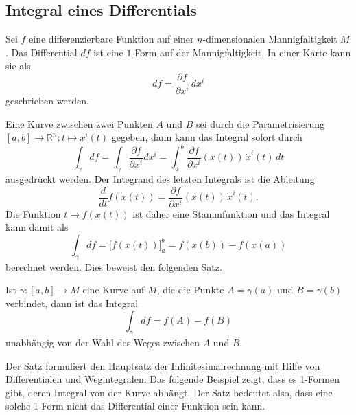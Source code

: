 %
%
\subsection{Integral eines Differentials}
Sei $f$ eine differenzierbare Funktion auf einer $n$-dimensionalen
Mannigfaltigkeit $M$.
Das Differential $df$ ist eine $1$-Form auf der Mannigfaltigkeit.
In einer Karte kann sie als
\[
df
=
\frac{\partial f}{\partial x^i}\,dx^i
\]
geschrieben werden.

Eine Kurve zwischen zwei Punkten $A$ und $B$ sei durch die 
Parametrisierung $[a,b]\to\mathbb{R}^n:t\mapsto x^i(t)$ gegeben,
dann kann das Integral sofort durch
\[
\int_{\gamma} df
=
\int_{\gamma} \frac{\partial f}{\partial x^i} dx^i
=
\int_a^b \frac{\partial f}{\partial x^i}(x(t))\,\dot{x}^i(t)\,dt
\]
ausgedrückt werden.
Der Integrand des letzten Integrals ist die Ableitung
\[
\frac{d}{dt} f(x(t))
=
\frac{\partial f}{\partial x^i}(x(t))\,\dot{x}^i(t).
\]
Die Funktion $t\mapsto f(x(t))$ ist daher eine Stammfunktion und
das Integral kann damit als
\[
\int_{\gamma} df
=
\bigl[ f(x(t)) \bigr]_a^b
=
f(x(b)) - f(x(a))
\]
berechnet werden.
Dies beweist den folgenden Satz.

\begin{satz}
Ist $\gamma\colon[a,b]\to M$ eine Kurve auf $M$, die die Punkte $A=\gamma(a)$
und $B=\gamma(b)$ verbindet, dann ist das Integral
\[
\int_\gamma df
=
f(A) - f(B)
\]
unabhängig von der Wahl des Weges zwischen $A$ und $B$.
\end{satz}

Der Satz formuliert den Hauptsatz der Infinitesimalrechnung mit Hilfe
von Differentialen und Wegintegralen.
Das folgende Beispiel zeigt, dass es 1-Formen gibt, deren Integral
von der Kurve abhängt.
Der Satz bedeutet also, dass eine solche 1-Form nicht das Differential
einer Funktion sein kann.

